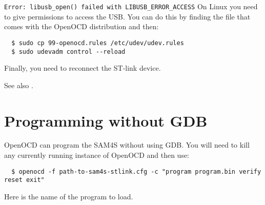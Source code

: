 \verb+Error: libusb_open() failed with LIBUSB_ERROR_ACCESS+ On Linux
you need to give permissions to access the USB.  You can do this by
finding the file  that comes with the OpenOCD
distribution and then:
%
\begin{verbatim}
  $ sudo cp 99-openocd.rules /etc/udev/udev.rules
  $ sudo udevadm control --reload
\end{verbatim}
%
Finally, you need to reconnect the ST-link device.


See also .


\section{Programming without GDB}

OpenOCD can program the SAM4S without using GDB.  You will need to
kill any currently running instance of OpenOCD and then use:
%
\begin{verbatim}
  $ openocd -f path-to-sam4s-stlink.cfg -c "program program.bin verify reset exit"
\end{verbatim}
%
Here  is the name of the program to load.
